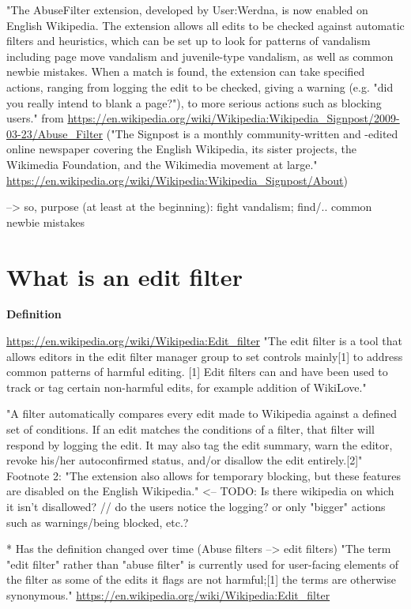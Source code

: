 \documentclass{sigchi}
\begin{document}
"The AbuseFilter extension, developed by User:Werdna, is now enabled on English Wikipedia. The extension allows all edits to be checked against automatic filters and heuristics, which can be set up to look for patterns of vandalism including page move vandalism and juvenile-type vandalism, as well as common newbie mistakes. When a match is found, the extension can take specified actions, ranging from logging the edit to be checked, giving a warning (e.g. "did you really intend to blank a page?"), to more serious actions such as blocking users."
from \url{https://en.wikipedia.org/wiki/Wikipedia:Wikipedia_Signpost/2009-03-23/Abuse_Filter}
("The Signpost is a monthly community-written and -edited online newspaper covering the English Wikipedia, its sister projects, the Wikimedia Foundation, and the Wikimedia movement at large." \url{https://en.wikipedia.org/wiki/Wikipedia:Wikipedia_Signpost/About})

--> so, purpose (at least at the beginning): fight vandalism; find/.. common newbie mistakes

\section{What is an edit filter}

\textbf{Definition}

\url{https://en.wikipedia.org/wiki/Wikipedia:Edit_filter}
"The edit filter is a tool that allows editors in the edit filter manager group to set controls mainly[1] to address common patterns of harmful editing.
[1] Edit filters can and have been used to track or tag certain non-harmful edits, for example addition of WikiLove."

"A filter automatically compares every edit made to Wikipedia against a defined set of conditions. If an edit matches the conditions of a filter, that filter will respond by logging the edit. It may also tag the edit summary, warn the editor, revoke his/her autoconfirmed status, and/or disallow the edit entirely.[2]"
Footnote 2: "The extension also allows for temporary blocking, but these features are disabled on the English Wikipedia." <-- TODO: Is there wikipedia on which it isn't disallowed?
// do the users notice the logging? or only "bigger" actions such as warnings/being blocked, etc.?

* Has the definition changed over time (Abuse filters --> edit filters)
"The term "edit filter" rather than "abuse filter" is currently used for user-facing elements of the filter as some of the edits it flags are not harmful;[1] the terms are otherwise synonymous."
\url{https://en.wikipedia.org/wiki/Wikipedia:Edit_filter}
\end{document}
